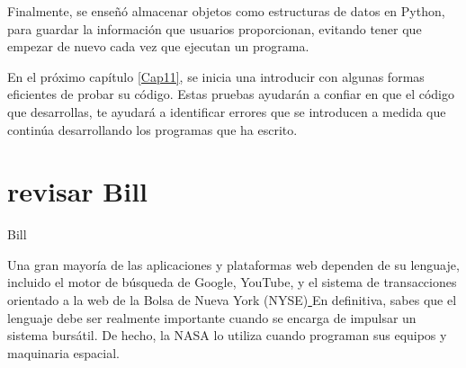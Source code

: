 Finalmente, se enseñó almacenar objetos como estructuras de datos en Python, para guardar la información que usuarios proporcionan, evitando tener que empezar de nuevo cada vez que ejecutan un programa. 





En el próximo capítulo \ref{Cap11}, se inicia una introducir  con algunas formas eficientes de probar su código.
Estas pruebas ayudarán a confiar en que el código que desarrollas, te ayudará a identificar
errores que se introducen a medida que continúa desarrollando los programas que ha escrito.






\section{revisar Bill}

Bill




Una gran mayoría de las aplicaciones y plataformas web dependen de su lenguaje, incluido el motor de búsqueda de Google, YouTube, y el sistema de transacciones orientado a la web de la Bolsa de Nueva York (NYSE)\href{https://www.cursosaula21.com/que-es-python/}{\color{vino} }
En definitiva, sabes que el lenguaje debe ser realmente importante cuando se encarga de impulsar un sistema bursátil. De hecho, la NASA lo utiliza cuando programan sus equipos y maquinaria espacial.
















{\centering{\color{blue}\rule{\linewidth}{0.75mm}} }








%  